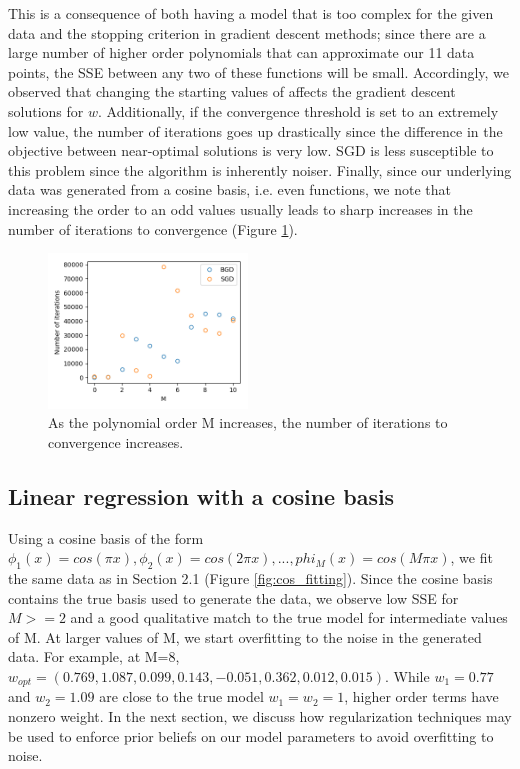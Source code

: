 \documentclass[10pt]{article}
\begin{document}
This is a consequence of both having a model that is too complex for the given data and the stopping criterion in gradient descent methods; since there are a large number of higher order polynomials that can approximate our 11 data points, the SSE between any two of these functions will be small. Accordingly, we observed that changing the starting values of affects the gradient descent solutions for $w$. Additionally, if the convergence threshold is set to an extremely low value, the number of iterations goes up drastically since the difference in the objective between near-optimal solutions is very low. SGD is less susceptible to this problem since the algorithm is inherently noiser. Finally, since our underlying data was generated from a cosine basis, i.e. even functions, we note that increasing the order to an odd values usually leads to sharp increases in the number of iterations to convergence (Figure \ref{fig:iter_vs_M}).

\begin{figure}
\caption{As the polynomial order M increases, the number of iterations to convergence increases.}
\begin{center}
\includegraphics[width=200px]{iter_vs_M}
\end{center}
\label{fig:iter_vs_M}
\end{figure}

\subsection{Linear regression with a cosine basis}

Using a cosine basis of the form $\phi_1(x) = cos(\pi x), \phi_2(x) = cos(2\pi x), ... , phi_M(x) = cos(M\pi x)$, we fit the same data as in Section 2.1 (Figure \ref{fig:cos_fitting}). Since the cosine basis contains the true basis used to generate the data, we observe low SSE for $M>=2$ and a good qualitative match to the true model for intermediate values of M. At larger values of M, we start overfitting to the noise in the generated data. For example, at M=8, $w_{opt} =  (0.769, 1.087, 0.099, 0.143, -0.051, 0.362, 0.012, 0.015) $. While $w_1=0.77$ and $w_2=1.09$ are close to the true model $w_1 = w_2 = 1$, higher order terms have nonzero weight. In the next section, we discuss how regularization techniques may be used to enforce prior beliefs on our model parameters to avoid overfitting to noise.
\end{document}
